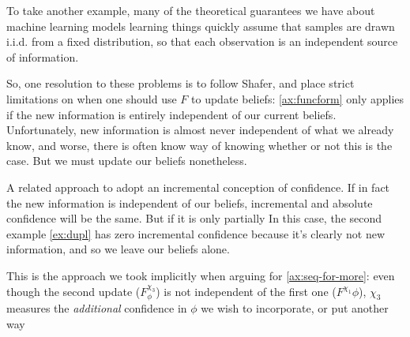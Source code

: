 To take another example, many of the theoretical guarantees we have 
about machine learning models learning things quickly assume that samples
are drawn i.i.d. from a fixed distribution, so that each observation is 
an independent source of information. 

So, one resolution to these problems is to follow Shafer,
and place strict limitations on when one should use $F$ to update beliefs:
\cref{ax:funcform} only applies if the new information is entirely independent
of our current beliefs. 
Unfortunately, new information is almost never independent of what we already know,
and worse, there is often know way of knowing whether or not this is the case.
But we must update our beliefs nonetheless.

A related approach to adopt an incremental conception of confidence.
If in fact the new information is independent of our beliefs, incremental
and absolute confidence will be the same.  But if it is only partially 
In this case, the second example \cref{ex:dupl} has zero incremental confidence
because it's clearly not new information, and so we leave our beliefs alone. 

This is the approach we took implicitly
when arguing for \cref{ax:seq-for-more}: even though the second update 
($F^{\chi_3}_\phi$) is not independent of the first one 
($F^{\chi_1}\phi$),
$\chi_3$ measures the \emph{additional} confidence in $\phi$ we wish
to incorporate, or put another way


